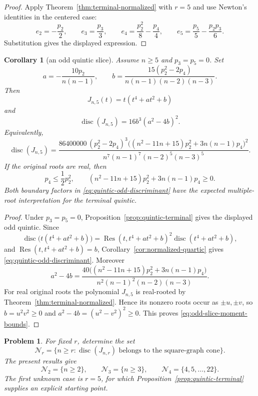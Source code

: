 \documentclass[11pt]{amsart}
\numberwithin{equation}{section}
\newtheorem{corollary}[theorem]{Corollary}
\newtheorem{problem}[theorem]{Problem}
\newcommand{\Res}{\operatorname{Res}}
\newcommand{\disc}{\operatorname{disc}}
\begin{document}
\begin{proof}
Apply Theorem~\ref{thm:terminal-normalized} with $r=5$ and use Newton's
identities in the centered case:
\[
e_2=-\frac{p_2}{2},\qquad e_3=\frac{p_3}{3},\qquad
e_4=\frac{p_2^2}{8}-\frac{p_4}{4},\qquad
e_5=\frac{p_5}{5}-\frac{p_2p_3}{6}.
\]
Substitution gives the displayed expression.
\end{proof}

\begin{corollary}[an odd quintic slice]\label{cor:quintic-odd-slice}
Assume $n\ge5$ and $p_3=p_5=0$.  Set
\[
 a=-\frac{10p_2}{n(n-1)},\qquad
 b=\frac{15(p_2^2-2p_4)}{n(n-1)(n-2)(n-3)}.
\]
Then
\[
 J_{n,5}(t)=t(t^4+at^2+b)
\]
and
\begin{equation}\label{eq:quintic-odd-discriminant}
       \disc(J_{n,5})=16b^3(a^2-4b)^2.
\end{equation}
Equivalently,
\[
\disc(J_{n,5})=
\frac{86400000\,(p_2^2-2p_4)^3
\bigl((n^2-11n+15)p_2^2+3n(n-1)p_4\bigr)^2}
{n^7(n-1)^7(n-2)^5(n-3)^5}.
\]
If the original roots are real, then
\begin{equation}\label{eq:odd-slice-moment-bounds}
 p_4\le\frac12p_2^2,
 \qquad
 (n^2-11n+15)p_2^2+3n(n-1)p_4\ge0.
\end{equation}
Both boundary factors in \eqref{eq:quintic-odd-discriminant} have the expected
multiple-root interpretation for the terminal quintic.
\end{corollary}

\begin{proof}
Under $p_3=p_5=0$, Proposition~\ref{prop:quintic-terminal} gives the displayed
odd quintic.  Since
\[
 \disc\bigl(t(t^4+at^2+b)\bigr)
 =\Res(t,t^4+at^2+b)^2\disc(t^4+at^2+b),
\]
and $\Res(t,t^4+at^2+b)=b$, Corollary~\ref{cor:normalized-quartic} gives
\eqref{eq:quintic-odd-discriminant}.  Moreover
\[
 a^2-4b=
 \frac{40\bigl((n^2-11n+15)p_2^2+3n(n-1)p_4\bigr)}
 {n^2(n-1)^2(n-2)(n-3)}.
\]
For real original roots the polynomial $J_{n,5}$ is real-rooted by
Theorem~\ref{thm:terminal-normalized}.  Hence its nonzero roots occur as
$\pm u,\pm v$, so $b=u^2v^2\ge0$ and
$a^2-4b=(u^2-v^2)^2\ge0$.  This proves
\eqref{eq:odd-slice-moment-bounds}.
\end{proof}

\begin{problem}\label{prob:terminal-cone}
For fixed $r$, determine the set
\[
 \mathcal N_r=\{n\ge r:\disc(J_{n,r})\text{ belongs to the square-graph cone}\}.
\]
The present results give
\[
 \mathcal N_2=\{n\ge2\},\qquad
 \mathcal N_3=\{n\ge3\},\qquad
 \mathcal N_4=\{4,5,\ldots,22\}.
\]
The first unknown case is $r=5$, for which
Proposition~\ref{prop:quintic-terminal} supplies an explicit starting point.
\end{problem}
\end{document}
